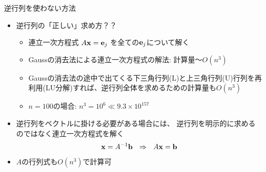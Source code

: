 \begin{frame}[t,fragile]{逆行列を使わない方法}
  \begin{itemize}
  \item 逆行列の「正しい」求め方？？
    \begin{itemize}
    \item 連立一次方程式 $A {\bf x} = {\bf e}_j$ を全ての${\bf e}_j$について解く
    \item Gaussの消去法による連立一次方程式の解法: 計算量〜$O(n^3)$
    \item Gaussの消去法の途中で出てくる下三角行列(L)と上三角行列(U)行列を再利用(LU分解)すれば、逆行列全体を求めるための計算量も$O(n^3)$
    \item $n=100$の場合: $n^3 = 10^6 \ll 9.3 \times 10^{157}$
    \end{itemize}
    \vspace*{1em}
  \item 逆行列をベクトルに掛ける必要がある場合には、{\color{red} 逆行列を明示的に求めるのではなく連立一次方程式を解く}
    \[ {\bf x} = A^{-1} {\bf b} \ \ \Rightarrow \ \ A {\bf x} = {\bf b} \]
  \item $A$の行列式も$O(n^3)$で計算可
  \end{itemize}
\end{frame}
